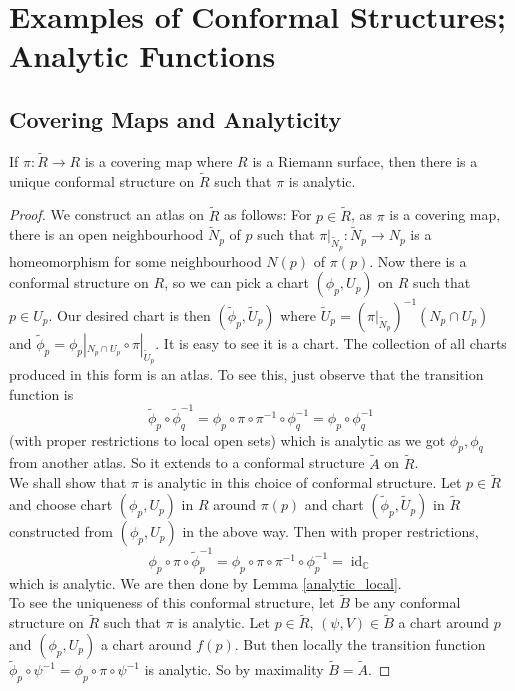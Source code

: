 \section{Examples of Conformal Structures; Analytic Functions}
\subsection{Covering Maps and Analyticity}
\begin{lemma}\label{covering_conformal}
    If $\pi:\tilde{R}\to R$ is a covering map where $R$ is a Riemann surface, then there is a unique conformal structure on $\tilde{R}$ such that $\pi$ is analytic.
\end{lemma}
\begin{proof}
    We construct an atlas on $\tilde{R}$ as follows:
    For $p\in\tilde{R}$, as $\pi$ is a covering map, there is an open neighbourhood $\tilde{N}_p$ of $p$ such that $\pi|_{\tilde{N}_p}:\tilde{N}_p\to N_p$ is a homeomorphism for some neighbourhood $N(p)$ of $\pi(p)$.
    Now there is a conformal structure on $R$, so we can pick a chart $(\phi_p,U_p)$ on $R$ such that $p\in U_p$.
    Our desired chart is then $(\tilde{\phi}_p,\tilde{U}_p)$ where $\tilde{U}_p=(\pi|_{\tilde{N}_p})^{-1}(N_p\cap U_p)$ and $\tilde{\phi}_p=\phi_p|_{N_p\cap U_p}\circ\pi|_{\tilde{U}_p}$.
    It is easy to see it is a chart.
    The collection of all charts produced in this form is an atlas.
    To see this, just observe that the transition function is
    $$\tilde{\phi}_p\circ\tilde{\phi}_q^{-1}=\phi_p\circ\pi\circ\pi^{-1}\circ\phi_q^{-1}=\phi_p\circ\phi_q^{-1}$$
    (with proper restrictions to local open sets) which is analytic as we got $\phi_p,\phi_q$ from another atlas.
    So it extends to a conformal structure $\tilde{A}$ on $\tilde{R}$.\\
    We shall show that $\pi$ is analytic in this choice of conformal structure.
    Let $p\in\tilde{R}$ and choose chart $(\phi_p,U_p)$ in $R$ around $\pi(p)$ and chart $(\tilde{\phi}_p,\tilde{U}_p)$ in $\tilde{R}$ constructed from $(\phi_p,U_p)$ in the above way.
    Then with proper restrictions,
    $$\phi_p\circ\pi\circ\tilde{\phi}_p^{-1}=\phi_p\circ\pi\circ\pi^{-1}\circ\phi_p^{-1}=\operatorname{id}_{\mathbb C}$$
    which is analytic.
    We are then done by Lemma \ref{analytic_local}.\\
    To see the uniqueness of this conformal structure, let $\tilde{B}$ be any conformal structure on $\tilde{R}$ such that $\pi$ is analytic.
    Let $p\in\tilde{R}$, $(\psi,V)\in\tilde{B}$ a chart around $p$ and $(\phi_p,U_p)$ a chart around $f(p)$.
    But then locally the transition function $\tilde\phi_p\circ\psi^{-1}=\phi_p\circ\pi\circ\psi^{-1}$ is analytic.
    So by maximality $\tilde{B}=\tilde{A}$.
\end{proof}
